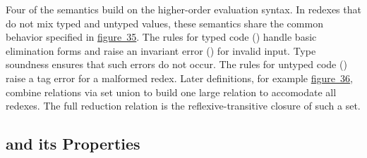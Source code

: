 \documentclass[ twoside,open=right,titlepage,numbers=noenddot,headinclude,%
                footinclude=true,cleardoublepage=empty,abstract=off,
                BCOR=5mm,paper=a4,fontsize=11pt,%
                ngerman,american,%
                parts,pdfspacing]{scrreprt}
\newcommand{\Ssubsubsection}[2]{\subsubsection[#1]{#2}}
\newcommand{\FigureRef}[2]{#1}
\renewcommand{\Ssubsubsection}[2]{\subsection[#1]{#2}}
\begin{document}
Four of the semantics build on the higher{-}order evaluation syntax.
In redexes that do not mix typed and untyped values, these semantics
 share the common behavior specified in \hyperref[t:x28counter_x28x22figurex22_x22figx3acommonx2dreductionx22x29x29]{figure~\FigureRef{35}{t:x28counter_x28x22figurex22_x22figx3acommonx2dreductionx22x29x29}}.
The rules for typed code (\relax{$\snredsta$}) handle basic elimination forms
 and raise an invariant error (\relax{$\tagerrorS$}) for invalid input.
Type soundness ensures that such errors do not occur.
The rules for untyped code (\relax{$\snreddyn$}) raise a tag error for a malformed redex.
Later definitions, for example \hyperref[t:x28counter_x28x22figurex22_x22figx3anaturalx2dreductionx22x29x29]{figure~\FigureRef{36}{t:x28counter_x28x22figurex22_x22figx3anaturalx2dreductionx22x29x29}}, combine
 relations via set union to build one large relation to accomodate all redexes.
The full reduction relation is the reflexive{-}transitive closure of such a set.

\Ssubsubsection{\relax{\nname} and its Properties}{\relax{\nname} and its Properties}\label{t:x28part_x22secx3adesignx3atechx3anaturalx22x29}

\label{sec:design:tech:natural}
\end{document}
